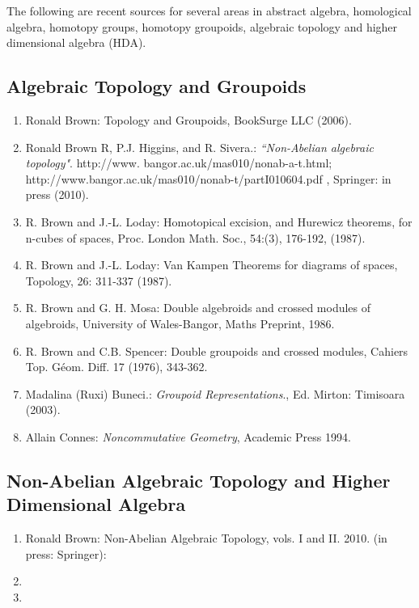 \documentclass[12pt]{article}
\theoremstyle{plain}
\theoremstyle{definition}
\numberwithin{equation}{section}
\begin{document}
The following are recent sources for several areas in abstract algebra, homological algebra, homotopy groups, homotopy groupoids, algebraic topology and higher dimensional algebra (HDA).

\subsection{Algebraic Topology and Groupoids}
\begin{enumerate}
\item Ronald Brown: Topology and Groupoids, BookSurge LLC (2006).
\item Ronald Brown R, P.J. Higgins, and R. Sivera.: \emph{``Non-Abelian algebraic topology"}.
 http://www. bangor.ac.uk/mas010/nonab-a-t.html; http://www.bangor.ac.uk/mas010/nonab-t/partI010604.pdf , 
Springer: in press (2010).
\item R. Brown and J.-L. Loday: Homotopical excision, and Hurewicz theorems, for n-cubes of spaces, Proc. London Math. Soc., 54:(3), 176-192, (1987).
\item R. Brown and J.-L. Loday: Van Kampen Theorems for diagrams of spaces, Topology, 26: 311-337 (1987).
\item R. Brown and G. H. Mosa: Double algebroids and crossed modules of algebroids, University of Wales-Bangor, Maths Preprint, 1986.
\item R. Brown and C.B. Spencer: Double groupoids and crossed modules, Cahiers Top. G\'eom. Diff. 17 (1976), 343-362.
\item Madalina (Ruxi) Buneci.: \emph{Groupoid Representations}., Ed. Mirton: Timisoara (2003).
\item Allain Connes: \emph{Noncommutative Geometry}, Academic Press 1994.
\end{enumerate}

\subsection{Non-Abelian Algebraic Topology and Higher Dimensional Algebra}
\begin{enumerate}
\item Ronald Brown: Non-Abelian Algebraic Topology, vols. I and II. 2010. (in press: Springer): 

\item {}

\item  {}

\end{enumerate}
\end{document}
